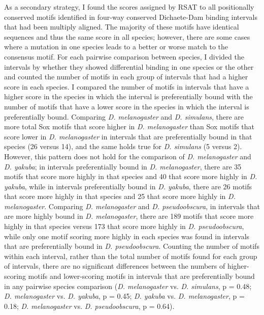 As a secondary strategy, I found the scores assigned by RSAT to all positionally conserved motifs identified in four-way conserved Dichaete-Dam binding intervals that had been multiply aligned. The majority of these motifs have identical sequences and thus the same score in all species; however, there are some cases where a mutation in one species leads to a better or worse match to the consensus motif. For each pairwise comparison between species, I divided the intervals by whether they showed differential binding in one species or the other and counted the number of motifs in each group of intervals that had a higher score in each species. I compared the number of motifs in intervals that have a higher score in the species in which the interval is preferentially bound with the number of motifs that have a lower score in the species in which the interval is preferentially bound. Comparing \emph{D. melanogaster} and \emph{D. simulans}, there are more total Sox motifs that score higher in \emph{D. melanogaster} than Sox motifs that score lower in \emph{D. melanogaster} in intervals that are preferentially bound in that species (26 versus 14), and the same holds true for \emph{D. simulans} (5 versus 2). However, this pattern does not hold for the comparison of \emph{D. melanogaster} and \emph{D. yakuba}; in intervals preferentially bound in \emph{D. melanogaster}, there are 35 motifs that score more highly in that species and 40 that score more highly in \emph{D. yakuba}, while in intervals preferentially bound in \emph{D. yakuba}, there are 26 motifs that score more highly in that species and 25 that score more highly in \emph{D. melanogaster}. Comparing \emph{D. melanogaster} and \emph{D. pseudoobscura}, in intervals that are more highly bound in \emph{D. melanogaster}, there are 189 motifs that score more highly in that species versus 173 that score more highly in \emph{D. pseudoobscura}, while only one motif scoring more highly in each species was found in intervals that are preferentially bound in \emph{D. pseudoobscura}. Counting the number of motifs within each interval, rather than the total number of motifs found for each group of intervals, there are no significant differences between the numbers of higher-scoring motifs and lower-scoring motifs in intervals that are preferentially bound in any pairwise species comparison (\emph{D. melanogaster} vs. \emph{D. simulans}, p = 0.48; \emph{D. melanogaster} vs. \emph{D. yakuba}, p = 0.45; \emph{D. yakuba} vs. \emph{D. melanogaster}, p = 0.18; \emph{D. melanogaster} vs. \emph{D. pseudoobscura}, p = 0.64).

